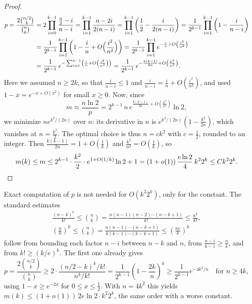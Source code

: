 \begin{proof}
    \begin{align*}
        p = \frac{2 \binom{n/2}{k}}{\binom{n}{k}}
        &= 2 \prod_{i=0}^{k-1} \frac{\frac{n}{2} - i}{n - i}
        = \prod_{i=1}^{k-1} \frac{n - 2i}{2(n - i)}
        = \prod_{i=1}^{k-1} \left( \frac{1}{2} - \frac{i}{2(n-i)} \right)
        = \frac{1}{2^{k-1}} \prod_{i=1}^{k-1} \left( 1 - \frac{i}{n - i} \right) \\
        &= \frac{1}{2^{k-1}} \prod_{i=1}^{k-1} \left( 1 - \frac{i}{n} + O\Bigl( \frac{i^2}{n^2} \Bigr) \right)
        = \frac{1}{2^{k-1}} \prod_{i=1}^{k-1} e^{-\frac{i}{n} + O\left( \frac{i^2}{n^2} \right)} \\
        &= \frac{1}{2^{k-1}} \, e^{-\sum_{i=1}^{k-1} \left( \frac{i}{n} + O\left( \frac{i^2}{n^2} \right) \right)}
        = \frac{1}{2^{k-1}} \, e^{-\frac{k(k-1)}{2n} + O\left( \frac{k^3}{n^2} \right)}.
    \end{align*}
    Here we assumed \(n \ge 2k\), so that \(\frac{i}{n-i} \le 1\) and \(\frac{i}{n-i} = \frac{i}{n} + O(\frac{i^2}{n^2})\), and used \(1 - x = e^{-x + O(x^2)}\) for small \(x \ge 0\). Now, since
    \[
        m \approx \frac{n \ln 2}{p} = 2^{k-1} \, n \, e^{\frac{k(k-1)}{2n} + O\left( \frac{k^3}{n^2} \right)} \ln 2,
    \]
    we minimize \(n e^{k^2/(2n)}\) over \(n\): its derivative in \(n\) is \(e^{k^2/(2n)} (1 - \frac{k^2}{2n})\), which vanishes at \(n = \frac{k^2}{2}\). The optimal choice is thus \(n = c k^2\) with \(c = \frac{1}{2}\), rounded to an integer. Then \(\frac{k(k-1)}{2n} = 1 + O(\frac{1}{k})\) and \(\frac{k^3}{n^2} = O(\frac{1}{k})\), so
    \[
        m(k) \le m \le 2^{k-1} \cdot \frac{k^2}{2} \cdot e^{1 + O(1/k)} \ln 2 + 1 = (1 + o(1)) \, \frac{e \ln 2}{4} \, k^2 2^k \le C k^2 2^k. \qedhere
    \]
\end{proof}

\begin{remark}\label{rmk:binomial-estimates}
    Exact computation of \(p\) is not needed for \(O(k^2 2^k)\), only for the constant. The standard estimates
    \begin{gather*}
        \frac{(n-k)^k}{k!} \le \binom{n}{k} = \frac{n(n-1)(n-2) \cdots (n-k+1)}{k!} \le \frac{n^k}{k!}, \\
        \left( \frac{n}{k} \right)^k \le \binom{n}{k} = \frac{n(n-1) \cdots (n-k+1)}{k(k-1) \cdots (k-k+1)} \le \left( \frac{ne}{k} \right)^k
    \end{gather*}
    follow from bounding each factor \(n - i\) between \(n - k\) and \(n\), from \(\frac{n-i}{k-i} \ge \frac{n}{k}\), and from \(k! \ge (k/e)^k\). The first one already gives
    \[
        p = \frac{2 \binom{n/2}{k}}{\binom{n}{k}} \ge 2 \cdot \frac{(n/2 - k)^k / k!}{n^k / k!} = \frac{1}{2^{k-1}} \left( 1 - \frac{2k}{n} \right)^k \ge \frac{1}{2^{k-1}} e^{-4k^2/n} \quad \text{for } n \ge 4k,
    \]
    using \(1 - x \ge e^{-2x}\) for \(0 \le x \le \frac{1}{2}\). With \(n = 4k^2\) this yields \(m(k) \le (1 + o(1)) \, 2e \ln 2 \cdot k^2 2^k\), the same order with a worse constant.
\end{remark}

